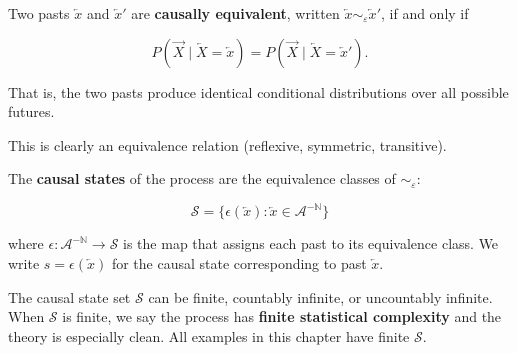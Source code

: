\begin{definition}
Two pasts $\overleftarrow{x}$ and $\overleftarrow{x}'$ are \textbf{causally equivalent}, written $\overleftarrow{x} \sim_\varepsilon \overleftarrow{x}'$, if and only if

\[
P(\overrightarrow{X} \mid \overleftarrow{X} = \overleftarrow{x}) = P(\overrightarrow{X} \mid \overleftarrow{X} = \overleftarrow{x}').
\]

That is, the two pasts produce identical conditional distributions over all possible futures.

This is clearly an equivalence relation (reflexive, symmetric, transitive).
\end{definition}

\begin{definition}
The \textbf{causal states} of the process are the equivalence classes of $\sim_\varepsilon$:

\[
\mathcal{S} = \{ \epsilon(\overleftarrow{x}) : \overleftarrow{x} \in \mathcal{A}^{-\mathbb{N}} \} 
\]

where $\epsilon: \mathcal{A}^{-\mathbb{N}} \to \mathcal{S}$ is the map that assigns each past to its equivalence class. We write $s = \epsilon(\overleftarrow{x})$ for the causal state corresponding to past $\overleftarrow{x}$.
\end{definition}

\begin{remark}
The causal state set $\mathcal{S}$ can be finite, countably infinite, or uncountably infinite. When $\mathcal{S}$ is finite, we say the process has \textbf{finite statistical complexity} and the theory is especially clean. All examples in this chapter have finite $\mathcal{S}$.
\end{remark}


